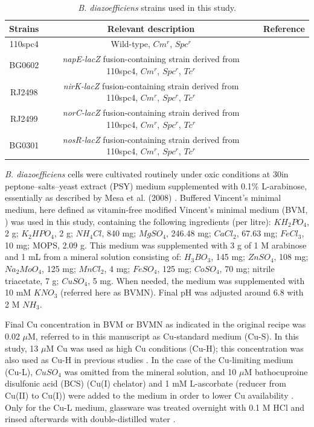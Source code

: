 \documentclass[a4paper,11pt]{article}
\begin{document}
\begin{table}[h!]
\centering
\caption{{\em B. diazoefficiens} strains used in this study.}
\begin{tabular}{|c|c|c|}
\hline
\textbf{Strains} & \textbf{Relevant description} & \textbf{Reference} \\
\hline
110spc4 & Wild-type, $Cm^r$, $Spc^r$ & \cite{regensburger1983rna} \\
\hline
BG0602 & {\em napE-lacZ} fusion-containing strain derived from 110spc4, $Cm^r$, $Spc^r$, $Tc^r$ & \cite{robles2006bradyrhizobium} \\
\hline
RJ2498 & {\em nirK-lacZ} fusion-containing strain derived from 110spc4, $Cm^r$, $Spc^r$, $Tc^r$ & \cite{mesa2003bradyrhizobium} \\
\hline
RJ2499 & {\em norC-lacZ} fusion-containing strain derived from 110spc4, $Cm^r$, $Spc^r$, $Tc^r$ & \cite{mesa2003bradyrhizobium} \\
\hline
BG0301 & {\em nosR-lacZ} fusion-containing strain derived from 110spc4, $Cm^r$, $Spc^r$, $Tc^r$ & \cite{torres2017fixk2}\\
\hline
\end{tabular}
\label{tab:table1}
\end{table}

{\em B. diazoefficiens}
cells were cultivated routinely under oxic conditions at 30\textcelsius in peptone–salts–yeast extract
(PSY) medium supplemented with 0.1\% L-arabinose, essentially as described by Mesa et al.
(2008) \cite{mesa2008comprehensive}. Buffered Vincent’s minimal medium, here defined as vitamin-free modified
Vincent’s minimal medium (BVM, \cite{vincent1970manual}\cite{becker2004global}) was used in this study, containing the following
ingredients (per litre): $KH_2PO_4$, 2 g; $K_2HPO_4$, 2 g; $NH_4Cl$, 840 mg; $MgSO_4$, 246.48 mg;
$CaCl_2$, 67.63 mg; $FeCl_3$, 10 mg; MOPS, 2.09 g. This medium was supplemented
with 3 g of 1 M arabinose and 1 mL from a mineral solution \cite{bishop1976relation} consisting of: $H_3BO_3$,
145 mg; $ZnSO_4$, 108 mg; $Na_2MoO_4$, 125 mg; $MnCl_2$, 4 mg; $FeSO_4$,
125 mg; $CoSO_4$, 70 mg; nitrile triacetate, 7 g; $CuSO_4$, 5 mg. When needed, the
medium was supplemented with 10 mM $KNO_3$ (referred here as BVMN). Final pH was
adjusted around 6.8 with 2 M $NH_3$.

Final Cu concentration in BVM or BVMN as indicated in the original recipe \cite{vincent1970manual} was
0.02 $\mu$M, referred to in this manuscript as Cu-standard medium (Cu-S). In this study, 13 $\mu$M
Cu was used as high Cu conditions (Cu-H); this concentration was also used as Cu-H in
previous studies \cite{felgate2012impact}\cite{sullivan2013copper}. In the case of the Cu-limiting medium (Cu-L), $CuSO_4$ was
omitted from the mineral solution, and 10 $\mu$M bathocuproine disulfonic acid (BCS) (Cu(I)
chelator) and 1 mM L-ascorbate (reducer from Cu(II) to Cu(I)) were added to the medium
in order to lower Cu availability \cite{felgate2012impact}\cite{serventi2012copper}. Only for the Cu-L medium, glassware was treated
overnight with 0.1 M HCl and rinsed afterwards with double-distilled water \cite{serventi2012copper}.
\end{document}
